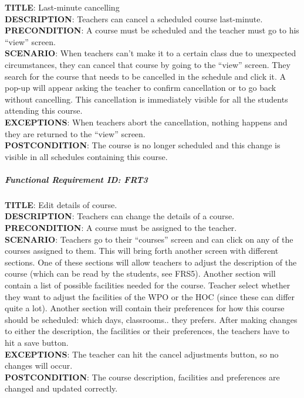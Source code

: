 \documentclass[12pt]{article}
\begin{document}
\textbf{TITLE}: Last-minute cancelling\\\textbf{DESCRIPTION}: Teachers
can cancel a scheduled course last-minute.\\\textbf{PRECONDITION}: A
course must be scheduled and the teacher must go to his ``view''
screen.\\\textbf{SCENARIO}: When teachers can't make it to a certain
class due to unexpected circumstances, they can cancel that course by
going to the ``view'' screen. They search for the course that needs to
be cancelled in the schedule and click it. A pop-up will appear asking
the teacher to confirm cancellation or to go back without cancelling.
This cancellation is immediately visible for all the students attending
this course.\\\textbf{EXCEPTIONS}: When teachers abort the cancellation,
nothing happens and they are returned to the ``view''
screen.\\\textbf{POSTCONDITION}: The course is no longer scheduled and
this change is visible in all schedules containing this course.

\subparagraph{Functional Requirement \textbf{ID}:
FRT3}\label{functional-requirement-id-frt3}

\textbf{TITLE}: Edit details of course.\\\textbf{DESCRIPTION}: Teachers
can change the details of a course.\\\textbf{PRECONDITION}: A course
must be assigned to the teacher.\\\textbf{SCENARIO}: Teachers go to
their ``courses'' screen and can click on any of the courses assigned to
them. This will bring forth another screen with different sections. One
of these sections will allow teachers to adjust the description of the
course (which can be read by the students, see FRS5). Another section
will contain a list of possible facilities needed for the course.
Teacher select whether they want to adjust the facilities of the WPO or
the HOC (since these can differ quite a lot). Another section will
contain their preferences for how this course should be scheduled: which
days, classrooms.. they prefers. After making changes to either the
description, the facilities or their preferences, the teachers have to
hit a save button.\\\textbf{EXCEPTIONS}: The teacher can hit the cancel
adjustments button, so no changes will occur.\\\textbf{POSTCONDITION}:
The course description, facilities and preferences are changed and
updated correctly.
\end{document}
